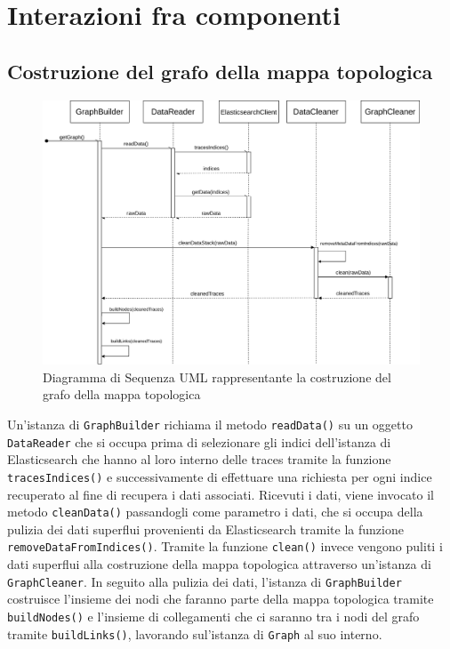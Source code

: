 
\section{Interazioni fra componenti}
\label{sec:Interazioni}
\subsection{Costruzione del grafo della mappa topologica}

\begin{figure}[H]
	\centering
	\includegraphics[width=1\textwidth]{Images/DiagrammaSequenzaGraph.png}
	\caption{Diagramma di Sequenza UML rappresentante la costruzione del grafo della mappa topologica}
	\label{img:seqGraph}
\end{figure}

Un'istanza di \texttt{GraphBuilder} richiama il metodo \texttt{readData()} su un oggetto \texttt{DataReader} che si occupa prima di selezionare gli indici dell'istanza di Elasticsearch che hanno al loro interno delle traces tramite la funzione \texttt{tracesIndices()} e successivamente di effettuare una richiesta per ogni indice recuperato al fine di recupera i dati associati.
Ricevuti i dati, viene invocato il metodo \texttt{cleanData()} passandogli come parametro i dati, che si occupa della pulizia dei dati superflui provenienti da Elasticsearch tramite la funzione \texttt{removeDataFromIndices()}. Tramite la funzione \texttt{clean()} invece vengono puliti i dati superflui alla costruzione della mappa topologica attraverso un'istanza di \texttt{GraphCleaner}.
In seguito alla pulizia dei dati, l'istanza di \texttt{GraphBuilder} costruisce l'insieme dei nodi che faranno parte della mappa topologica tramite \texttt{buildNodes()} e l'insieme di collegamenti che ci saranno tra i nodi del grafo tramite \texttt{buildLinks()}, lavorando sul'istanza di \texttt{Graph} al suo interno.


